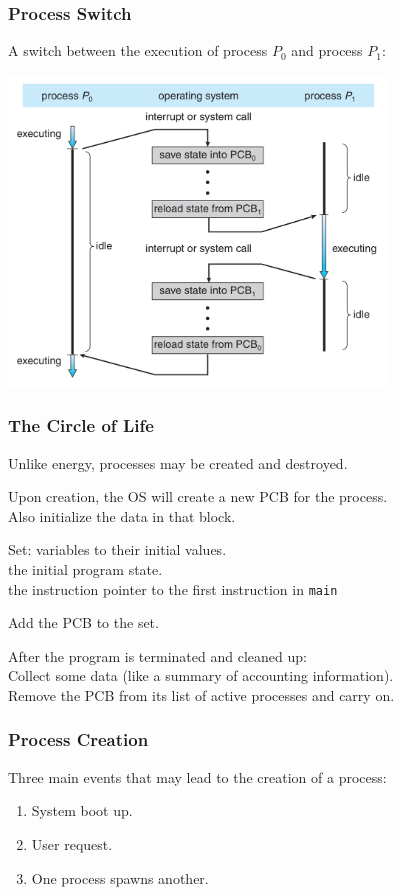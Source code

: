 \begin{frame}
\frametitle{Process Switch}

A switch between the execution of process $P_{0}$ and process $P_{1}$:

\begin{center}
\includegraphics[width=0.75\textwidth]{images/process-switch.png}
\end{center}

\end{frame}


\begin{frame}
\frametitle{The Circle of Life}


Unlike energy, processes may be created and destroyed. 

Upon creation, the OS will create a new PCB for the process.\\
\quad Also initialize the data in that block. 

Set: variables to their initial values.\\
\quad the initial program state.\\
\quad the instruction pointer to the first instruction in \texttt{main}

Add the PCB to the set.

After the program is terminated and cleaned up:\\
\quad Collect some data (like a summary of accounting information).\\
\quad Remove the PCB from its list of active processes and carry on.


\end{frame}

\begin{frame}
\frametitle{Process Creation}

Three main events that may lead to the creation of a process:

\begin{enumerate}
	\item System boot up.
	\item User request.
	\item One process spawns another.
\end{enumerate}


\end{frame}

